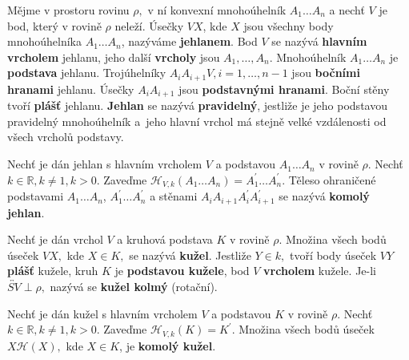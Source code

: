 \begin{definition}
Mějme v prostoru rovinu $\rho,$ v ní konvexní mnohoúhelník $A_1\dots A_n$ a nechť
$V$ je bod, který v rovině $\rho$ neleží. Úsečky $VX$, kde $X$ jsou všechny body
mnohoúhelníka $A_1\dots A_n$, nazýváme \textbf{jehlanem}. Bod $V$ se nazývá
\textbf{hlavním vrcholem} jehlanu, jeho další \textbf{vrcholy} jsou $A_1,\dots,A_n$.
Mnohoúhelník $A_1\dots A_n$ je \textbf{podstava} jehlanu. Trojúhelníky
$A_iA_{i+1}V, i=1,\dots,n-1$ jsou \textbf{bočními hranami} jehlanu.
Úsečky $A_iA_{i+1}$ jsou \textbf{podstavnými hranami}. Boční stěny tvoří \textbf{plášť}
jehlanu. \textbf{Jehlan} se nazývá \textbf{pravidelný}, jestliže je jeho podstavou
pravidelný mnohoúhelník a~jeho hlavní vrchol má stejně velké vzdálenosti od
všech vrcholů podstavy.
\end{definition}

\begin{definition}
    Nechť je dán jehlan s hlavním vrcholem $V$ a podstavou $A_1\dots A_n$ v rovině
    $\rho.$ Nechť $k \in \mathbb R, k \ne 1, k >0.$ Zaveďme $\mathscr H_{V,k}(A_1\dots A_n)
    =A_1^\prime\dots A_n^\prime.$ Těleso ohraničené podstavami $A_1\dots A_n$,
    $A_1^\prime\dots A_n^\prime$ a stěnami $A_iA_{i+1}A_i^\prime A_{i+1}^\prime$ se
    nazývá \textbf{komolý jehlan}.
\end{definition}

\begin{definition}
    Nechť je dán vrchol $V$ a kruhová podstava $K$ v rovině
    $\rho.$ Množina všech bodů úseček $VX,$ kde $X\in K,$ se nazývá \textbf{kužel}.
    Jestliže $Y\in k,$ tvoří body úseček $VY$ \textbf{plášť} kužele, kruh $K$ je
    \textbf{podstavou kužele}, bod $V$ \textbf{vrcholem} kužele. Je-li
    $\overleftrightarrow{SV}\perp \rho,$ nazývá se \textbf{kužel kolmý} (rotační).
\end{definition}

\begin{definition}
Nechť je dán kužel s hlavním vrcholem $V$ a podstavou $K$ v rovině
$\rho.$ Nechť $k \in \mathbb R, k \ne 1, k >0.$ Zaveďme $\mathscr H_{V,k}(K)
=K^\prime.$ Množina všech bodů úseček $X\mathscr H(X),$ kde $X\in K$, je
\textbf{komolý kužel}.
\end{definition}

